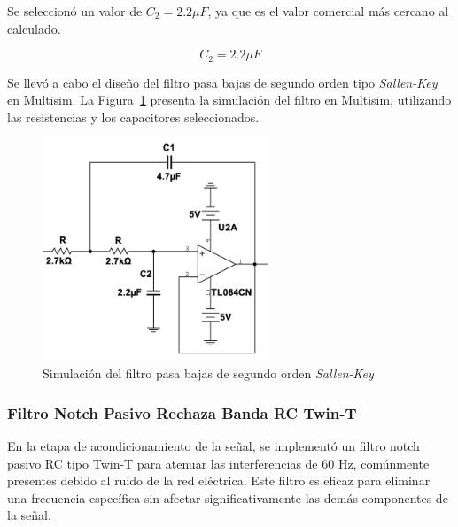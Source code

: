         Se seleccionó un valor de $C_2 = 2.2 \mu F$, ya que es el valor comercial más cercano al calculado.

        \begin{equation}
            C_2 = 2.2 \mu F
        \end{equation}

        Se llevó a cabo el diseño del filtro pasa bajas de segundo orden tipo \textit{Sallen-Key} en Multisim. La Figura~\ref{fig:Simulacion_Filtro_Pasa_Bajas} presenta la simulación del filtro en Multisim, utilizando las resistencias y los capacitores seleccionados.

        \begin{figure}[H]
            \centering
            \includegraphics[width=0.6\textwidth]{img/Desarrollo/multisim_pasaBajos.png}
            \caption[Simulación del filtro pasa bajas de segundo orden \textit{Sallen-Key}.]{Simulación del filtro pasa bajas de segundo orden \textit{Sallen-Key}\footnotemark}
            \label{fig:Simulacion_Filtro_Pasa_Bajas}
        \end{figure}
            
        \subsubsection{Filtro Notch Pasivo Rechaza Banda RC Twin-T}
        En la etapa de acondicionamiento de la señal, se implementó un filtro notch pasivo RC tipo Twin-T para atenuar las interferencias de 60 Hz, comúnmente presentes debido al ruido de la red eléctrica. Este filtro es eficaz para eliminar una frecuencia específica sin afectar significativamente las demás componentes de la señal.

